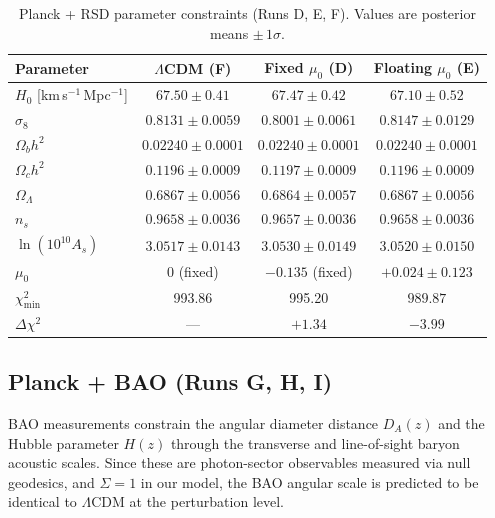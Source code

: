\documentclass[11pt]{article}
\begin{document}
\begin{table}[H]
\centering
\caption{Planck + RSD parameter constraints (Runs D, E, F). Values are posterior means $\pm\,1\sigma$.}
\label{tab:planck_rsd}
\begin{tabular}{lccc}
\toprule
Parameter & $\Lambda$CDM (F) & Fixed $\mu_0$ (D) & Floating $\mu_0$ (E) \\
\midrule
$H_0$ [km\,s$^{-1}$\,Mpc$^{-1}$] & $67.50 \pm 0.41$ & $67.47 \pm 0.42$ & $67.10 \pm 0.52$ \\
$\sigma_8$                          & $0.8131 \pm 0.0059$ & $0.8001 \pm 0.0061$ & $0.8147 \pm 0.0129$ \\
$\Omega_b h^2$                      & $0.02240 \pm 0.0001$ & $0.02240 \pm 0.0001$ & $0.02240 \pm 0.0001$ \\
$\Omega_c h^2$                      & $0.1196 \pm 0.0009$ & $0.1197 \pm 0.0009$ & $0.1196 \pm 0.0009$ \\
$\Omega_\Lambda$                    & $0.6867 \pm 0.0056$ & $0.6864 \pm 0.0057$ & $0.6867 \pm 0.0056$ \\
$n_s$                               & $0.9658 \pm 0.0036$ & $0.9657 \pm 0.0036$ & $0.9658 \pm 0.0036$ \\
$\ln(10^{10}A_s)$                   & $3.0517 \pm 0.0143$ & $3.0530 \pm 0.0149$ & $3.0520 \pm 0.0150$ \\
$\mu_0$                             & $0$ (fixed)         & $-0.135$ (fixed)    & $+0.024 \pm 0.123$ \\
\midrule
$\chi^2_\mathrm{min}$               & 993.86             & 995.20              & $989.87$ \\
$\Delta\chi^2$                      & ---                & $+1.34$             & $-3.99$ \\
\bottomrule
\end{tabular}
\end{table}


\subsection{Planck + BAO (Runs G, H, I)}
\label{sec:planck_bao}

BAO measurements constrain the angular diameter distance $D_A(z)$ and the Hubble parameter $H(z)$ through the transverse and line-of-sight baryon acoustic scales.
Since these are photon-sector observables measured via null geodesics, and $\Sigma = 1$ in our model, the BAO angular scale is predicted to be identical to $\Lambda$CDM at the perturbation level.
\end{document}
